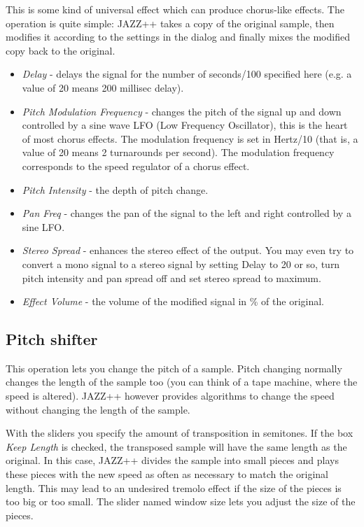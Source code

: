 \documentclass[letterpaper]{report}
\begin{document}
This is some kind of universal effect which can produce chorus-like effects.
The operation is quite simple: JAZZ++ takes a copy of the original sample,
then modifies it according to the settings in the dialog and finally
mixes the modified copy back to the original.

\begin{itemize}

\item {\em Delay} - delays the signal for the number of seconds/100 specified
here (e.g. a value of 20 means 200 millisec delay).

\item {\em Pitch Modulation Frequency} - changes the pitch of the signal up
and down controlled by a sine wave LFO (Low Frequency Oscillator), this is
the heart of most chorus effects.
The modulation frequency is set in Hertz/10 (that is, a value of 20 means 2
turnarounds per second). The modulation frequency corresponds to the speed
regulator of a chorus effect.

\item {\em Pitch Intensity} - the depth of pitch change.

\item {\em Pan Freq} - changes the pan of the signal to the left and right
controlled by a sine LFO.

\item {\em Stereo Spread} - enhances the stereo effect of the output. You
may even try to convert a mono signal to a stereo signal by setting Delay
to 20 or so, turn pitch intensity and pan spread off and set stereo spread
to maximum.

\item {\em Effect Volume} - the volume of the modified signal in \% of the
original.

\end{itemize}



\subsection{Pitch shifter}\label{pitchshifter}

This operation lets you change the pitch of a sample. Pitch changing
normally changes the length of the sample too (you can think of a tape
machine, where the speed is altered). JAZZ++ however provides algorithms
to change the speed without changing the length of the sample.

With the sliders you specify the amount of transposition in semitones.
If the box {\em Keep Length} is checked, the transposed sample will have the
same length as the original. In this case, JAZZ++ divides the sample
into small pieces and plays these pieces with the new speed as often as
necessary to match the original length. This may lead to an undesired
tremolo effect if the size of the pieces is too big or too small. The
slider named window size lets you adjust the size of the pieces.
\end{document}
